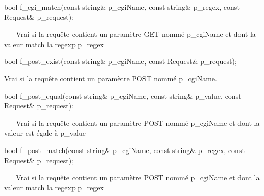 \begin{DoxyItemize}
\item 
\begin{DoxyCode}
\textcolor{keywordtype}{bool} f\_cgi\_match(\textcolor{keyword}{const} \textcolor{keywordtype}{string}& p\_cgiName, \textcolor{keyword}{const} \textcolor{keywordtype}{string}& p\_regex, \textcolor{keyword}{const} Request& p\_request); 
\end{DoxyCode}
 ~\newline
~\newline
 Vrai si la requête contient un paramètre G\+ET nommé p\+\_\+cgi\+Name et dont la valeur match la regexp p\+\_\+regex ~\newline
~\newline

\item 
\begin{DoxyCode}
\textcolor{keywordtype}{bool} f\_post\_exist(\textcolor{keyword}{const} \textcolor{keywordtype}{string}& p\_cgiName, \textcolor{keyword}{const} Request& p\_request); 
\end{DoxyCode}
 Vrai si la requête contient un paramètre P\+O\+ST nommé p\+\_\+cgi\+Name. ~\newline
~\newline
 ~\newline
~\newline

\item 
\begin{DoxyCode}
\textcolor{keywordtype}{bool} f\_post\_equal(\textcolor{keyword}{const} \textcolor{keywordtype}{string}& p\_cgiName, \textcolor{keyword}{const} \textcolor{keywordtype}{string}& p\_value, \textcolor{keyword}{const} Request& p\_request); 
\end{DoxyCode}
 ~\newline
~\newline
 Vrai si la requête contient un paramètre P\+O\+ST nommé p\+\_\+cgi\+Name et dont la valeur est égale à p\+\_\+value ~\newline
~\newline

\item 
\begin{DoxyCode}
\textcolor{keywordtype}{bool} f\_post\_match(\textcolor{keyword}{const} \textcolor{keywordtype}{string}& p\_cgiName, \textcolor{keyword}{const} \textcolor{keywordtype}{string}& p\_regex, \textcolor{keyword}{const} Request& p\_request); 
\end{DoxyCode}
 ~\newline
~\newline
 Vrai si la requête contient un paramètre P\+O\+ST nommé p\+\_\+cgi\+Name et dont la valeur match la regexp p\+\_\+regex ~\newline
~\newline


\end{DoxyItemize}
